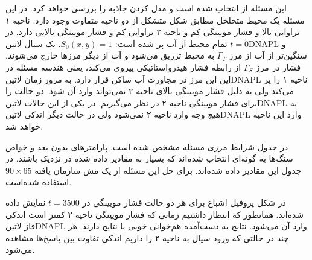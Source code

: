 این مسئله از  انتخاب شده است و مدل کردن جاذبه را بررسی خواهد کرد. در این مسئله یک محیط متخلخل مطابق شکل  متشکل از دو ناحیه متفاوت وجود دارد. ناحیه ۱ تراوایی بالا و فشار مویینگی کم و ناحیه ۲ تراوایی کم و فشار مویینگی بالایی دارد. در $t=0$ تمام محیط از آب پر شده است: $S_0(x,y) = 1$. یک سیال ‌لاتین{DNAPL} و سنگین‌تر از آب از مرز $\Gamma_T$ به محیط تزریق می‌شود و آب از دیگر مرز‌ها خارج می‌شوند. فشار در مرز $\Gamma_S$ از رابطه فشار هیدرواستاتیکی پیروی می‌کند، یعنی هندسه مسئله در این این مرز در مجاورت آب ساکن قرار دارد. به مرور زمان  ‌لاتین{DNAPL} ناحیه ۱ را پر می‌کند ولی به دلیل فشار مویینگی بالای ناحیه ۲ نمی‌تواند وارد آن شود. دو حالت را برای فشار مویینگی ناحیه ۲ در نظر می‌گیریم. در یکی از این حالات ‌لاتین{DNAPL} به هیچ وجه وارد ناحیه ۲ نمی‌شود ولی در حالت دیگر اندکی ‌لاتین{DNAPL} وارد این ناحیه خواهد شد.

 در جدول  شرایط مرزی مسئله مشخص شده است. پارامتر‌های بدون بعد و خواص سنگ‌ها به گونه‌ای انتخاب شده‌اند که بسیار به مقادیر داده شده در  نزدیک باشند. در جدول  این مقادیر داده‌ شده‌اند. برای حل این مسئله از یک مش سازمان یافته $90\times 65$ استفاده شده‌است. 
 
 در شکل  پروفیل اشباع برای هر دو حالت فشار مویینگی در $t=3500$ نمایش داده شده‌اند. همانطور که انتظار داشتیم زمانی که فشار مویینگی ناحیه ۲ کمتر است اندکی فاز ‌لاتین{DNAPL} وارد آن می‌شود. نتایج به دست‌آمده هم‌خوانی خوبی با نتایج    دارند. هر چند در حالتی که ورود سیال به ناحیه ۲ را داریم اندکی تفاوت بین پاسخ‌ها مشاهده می‌شود.
 
